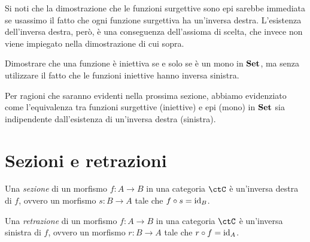 Si noti che la dimostrazione che le funzioni surgettive sono epi sarebbe immediata
se usassimo il fatto che ogni funzione surgettiva ha un'inversa destra.
L'esistenza dell'inversa destra, però, è una conseguenza dell'assioma di scelta,
che invece non viene impiegato nella dimostrazione di cui sopra.

\begin{exercise}
	Dimostrare che una funzione è iniettiva se e solo se è un mono in \(\mathbf{Set}\),
	ma senza utilizzare il fatto che le funzioni iniettive hanno inversa sinistra.
\end{exercise}

Per ragioni che saranno evidenti nella prossima sezione,
abbiamo evidenziato come l'equivalenza tra funzioni surgettive (iniettive)
e epi (mono) in \(\mathbf{Set}\) sia indipendente dall'esistenza di un'inversa destra (sinistra).



\section{Sezioni e retrazioni}

\begin{definition}[Sezione]
	Una \emph{sezione} di un morfismo \(f \colon A \to B\) in una categoria \(\ctC\) è un'inversa destra di \(f\), ovvero un morfismo \(s \colon B \to A\) tale che \(f \circ s = \mathrm{id}_{B}\).
\end{definition}

\begin{definition}[Retrazione]
	Una \emph{retrazione} di un morfismo \(f \colon A \to B\) in una categoria \(\ctC\) è un'inversa sinistra di \(f\), ovvero un morfismo \(r \colon B \to A\) tale che \(r \circ f = \mathrm{id}_{A}\).
\end{definition}